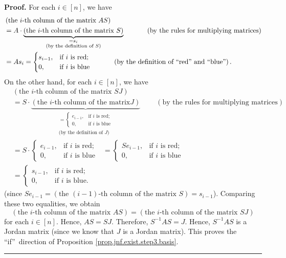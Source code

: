 \documentclass[numbers=enddot,12pt,final,onecolumn,notitlepage]{scrartcl}%
\numberwithin{exer}{subsection}
\theoremstyle{definition}
\newenvironment{proof}[1][Proof]{\noindent\textbf{#1.} }{\ \rule{0.5em}{0.5em}}
\begin{document}
\begin{proof}
For each $i\in\left[  n\right]  $, we have%
\begin{align*}
&  \left(  \text{the }i\text{-th column of the matrix }AS\right) \\
&  =A\cdot\underbrace{\left(  \text{the }i\text{-th column of the matrix
}S\right)  }_{\substack{=s_{i}\\\text{(by the definition of }S\text{)}%
}}\ \ \ \ \ \ \ \ \ \ \left(  \text{by the rules for multiplying
matrices}\right) \\
&  =As_{i}=%
\begin{cases}
s_{i-1}, & \text{if }i\text{ is red};\\
0, & \text{if }i\text{ is blue}%
\end{cases}
\ \ \ \ \ \ \ \ \ \ \left(  \text{by the definition of \textquotedblleft
red\textquotedblright\ and \textquotedblleft blue\textquotedblright}\right)  .
\end{align*}
On the other hand, for each $i\in\left[  n\right]  $, we have%
\begin{align*}
&  \left(  \text{the }i\text{-th column of the matrix }SJ\right) \\
&  =S\cdot\underbrace{\left(  \text{the }i\text{-th column of the matrix
}J\right)  }_{\substack{=%
\begin{cases}
e_{i-1}, & \text{if }i\text{ is red};\\
0, & \text{if }i\text{ is blue}%
\end{cases}
\\\text{(by the definition of }J\text{)}}}\ \ \ \ \ \ \ \ \ \ \left(  \text{by
the rules for multiplying matrices}\right) \\
&  =S\cdot%
\begin{cases}
e_{i-1}, & \text{if }i\text{ is red};\\
0, & \text{if }i\text{ is blue}%
\end{cases}
\ \ \ =%
\begin{cases}
Se_{i-1}, & \text{if }i\text{ is red};\\
0, & \text{if }i\text{ is blue}%
\end{cases}
\\
&  =%
\begin{cases}
s_{i-1}, & \text{if }i\text{ is red};\\
0, & \text{if }i\text{ is blue.}%
\end{cases}
\end{align*}
(since $Se_{i-1}=\left(  \text{the }\left(  i-1\right)  \text{-th column of
the matrix }S\right)  =s_{i-1}$). Comparing these two equalities, we obtain%
\[
\left(  \text{the }i\text{-th column of the matrix }AS\right)  =\left(
\text{the }i\text{-th column of the matrix }SJ\right)
\]
for each $i\in\left[  n\right]  $. Hence, $AS=SJ$. Therefore, $S^{-1}AS=J$.
Hence, $S^{-1}AS$ is a Jordan matrix (since we know that $J$ is a Jordan
matrix). This proves the \textquotedblleft if\textquotedblright\ direction of
Proposition \ref{prop.jnf.exist.step3.basis}.
\end{proof}
\end{document}
